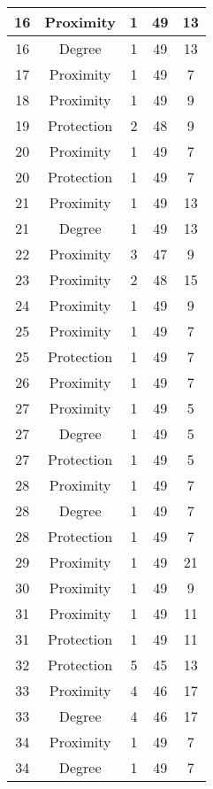 \documentclass[results.tex]{subfiles}
\begin{document}
\begin{center}
\begin{tabular}{| c || c | c | c | c |}
    \hline
    16 & Proximity & 1 & 49 & 13 \\ 
    \hline
    16 & Degree & 1 & 49 & 13 \\ 
    \hline
    17 & Proximity & 1 & 49 & 7 \\ 
    \hline
    18 & Proximity & 1 & 49 & 9 \\ 
    \hline
    19 & Protection & 2 & 48 & 9 \\ 
    \hline
    20 & Proximity & 1 & 49 & 7 \\ 
    \hline
    20 & Protection & 1 & 49 & 7 \\ 
    \hline
    21 & Proximity & 1 & 49 & 13 \\ 
    \hline
    21 & Degree & 1 & 49 & 13 \\ 
    \hline
    22 & Proximity & 3 & 47 & 9 \\ 
    \hline
    23 & Proximity & 2 & 48 & 15 \\ 
    \hline
    24 & Proximity & 1 & 49 & 9 \\ 
    \hline
    25 & Proximity & 1 & 49 & 7 \\ 
    \hline
    25 & Protection & 1 & 49 & 7 \\ 
    \hline
    26 & Proximity & 1 & 49 & 7 \\ 
    \hline
    27 & Proximity & 1 & 49 & 5 \\ 
    \hline
    27 & Degree & 1 & 49 & 5 \\ 
    \hline
    27 & Protection & 1 & 49 & 5 \\ 
    \hline
    28 & Proximity & 1 & 49 & 7 \\ 
    \hline
    28 & Degree & 1 & 49 & 7 \\ 
    \hline
    28 & Protection & 1 & 49 & 7 \\ 
    \hline
    29 & Proximity & 1 & 49 & 21 \\ 
    \hline
    30 & Proximity & 1 & 49 & 9 \\ 
    \hline
    31 & Proximity & 1 & 49 & 11 \\ 
    \hline
    31 & Protection & 1 & 49 & 11 \\ 
    \hline
    32 & Protection & 5 & 45 & 13 \\ 
    \hline
    33 & Proximity & 4 & 46 & 17 \\ 
    \hline
    33 & Degree & 4 & 46 & 17 \\ 
    \hline
    34 & Proximity & 1 & 49 & 7 \\ 
    \hline
    34 & Degree & 1 & 49 & 7 \\ 

\end{tabular}
\end{center}
\end{document}
